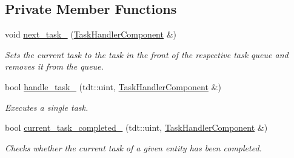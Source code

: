 \subsection*{Private Member Functions}
\begin{DoxyCompactItemize}
\item 
void \hyperlink{class_task_system_a67d212dfad77657783d003de3582ce39}{next\+\_\+task\+\_\+} (\hyperlink{struct_task_handler_component}{Task\+Handler\+Component} \&)
\begin{DoxyCompactList}\small\item\em Set\textquotesingle{}s the current task to the task in the front of the respective task queue and removes it from the queue. \end{DoxyCompactList}\item 
bool \hyperlink{class_task_system_a17c49a6994b1f6d0c915a5a1f44c9fe4}{handle\+\_\+task\+\_\+} (tdt\+::uint, \hyperlink{struct_task_handler_component}{Task\+Handler\+Component} \&)
\begin{DoxyCompactList}\small\item\em Executes a single task. \end{DoxyCompactList}\item 
bool \hyperlink{class_task_system_a95d963ee4e1619e4e0120696e5e34e75}{current\+\_\+task\+\_\+completed\+\_\+} (tdt\+::uint, \hyperlink{struct_task_handler_component}{Task\+Handler\+Component} \&)
\begin{DoxyCompactList}\small\item\em Checks whether the current task of a given entity has been completed. \end{DoxyCompactList}\end{DoxyCompactItemize}
